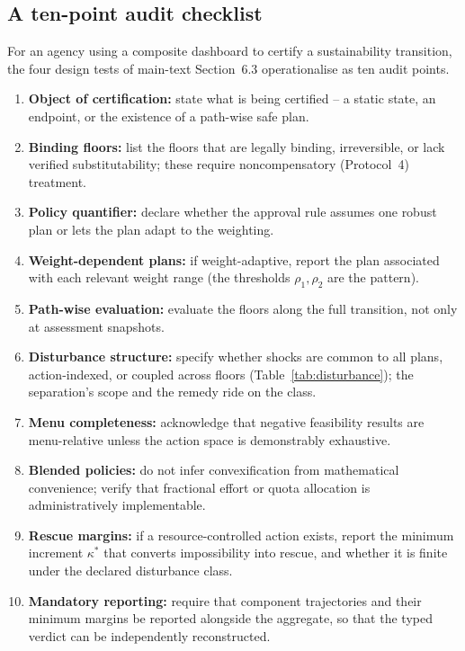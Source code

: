 \subsection{A ten-point audit checklist}

For an agency using a composite dashboard to certify a sustainability transition, the four design tests of main-text Section~6.3 operationalise as ten audit points.
\begin{enumerate}[leftmargin=2em]
\item \textbf{Object of certification:} state what is being certified -- a static state, an endpoint, or the existence of a path-wise safe plan.
\item \textbf{Binding floors:} list the floors that are legally binding, irreversible, or lack verified substitutability; these require noncompensatory (Protocol~4) treatment.
\item \textbf{Policy quantifier:} declare whether the approval rule assumes one robust plan or lets the plan adapt to the weighting.
\item \textbf{Weight-dependent plans:} if weight-adaptive, report the plan associated with each relevant weight range (the thresholds $\rho_1,\rho_2$ are the pattern).
\item \textbf{Path-wise evaluation:} evaluate the floors along the full transition, not only at assessment snapshots.
\item \textbf{Disturbance structure:} specify whether shocks are common to all plans, action-indexed, or coupled across floors (Table~\ref{tab:disturbance}); the separation's scope and the remedy ride on the class.
\item \textbf{Menu completeness:} acknowledge that negative feasibility results are menu-relative unless the action space is demonstrably exhaustive.
\item \textbf{Blended policies:} do not infer convexification from mathematical convenience; verify that fractional effort or quota allocation is administratively implementable.
\item \textbf{Rescue margins:} if a resource-controlled action exists, report the minimum increment $\kappa^*$ that converts impossibility into rescue, and whether it is finite under the declared disturbance class.
\item \textbf{Mandatory reporting:} require that component trajectories and their minimum margins be reported alongside the aggregate, so that the typed verdict can be independently reconstructed.
\end{enumerate}

